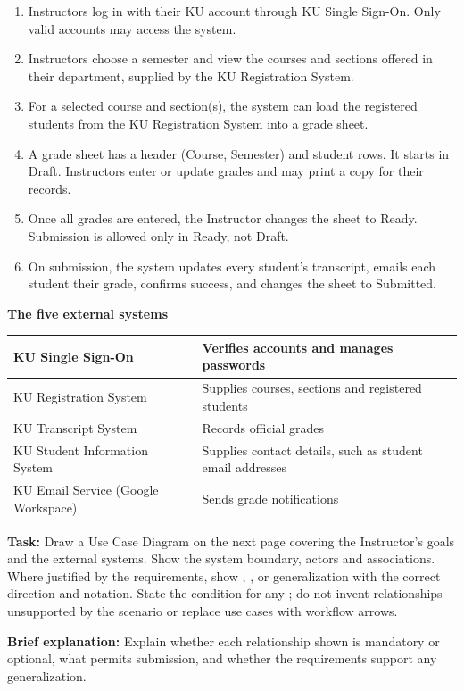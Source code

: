 \begin{enumerate}[itemsep=3pt]
\item Instructors log in with their KU account through KU Single Sign-On. Only valid accounts may access the system.
\item Instructors choose a semester and view the courses and sections offered in their department, supplied by the KU Registration System.
\item For a selected course and section(s), the system can load the registered students from the KU Registration System into a grade sheet.
\item A grade sheet has a header (Course, Semester) and student rows. It starts in Draft. Instructors enter or update grades and may print a copy for their records.
\item Once all grades are entered, the Instructor changes the sheet to Ready. Submission is allowed only in Ready, not Draft.
\item On submission, the system updates every student's transcript, emails each student their grade, confirms success, and changes the sheet to Submitted.
\end{enumerate}
\textbf{The five external systems}\par
\begin{tabularx}{\linewidth}{|>{\raggedright\arraybackslash}m{5.3cm}|Y|}\hline
KU Single Sign-On & Verifies accounts and manages passwords\\\hline
KU Registration System & Supplies courses, sections and registered students\\\hline
KU Transcript System & Records official grades\\\hline
KU Student Information System & Supplies contact details, such as student email addresses\\\hline
KU Email Service (Google Workspace) & Sends grade notifications\\\hline
\end{tabularx}
\par\medskip
\textbf{Task:} Draw a Use Case Diagram on the next page covering the Instructor's goals and the external systems. Show the system boundary, actors and associations. Where justified by the requirements, show , , or generalization with the correct direction and notation. State the condition for any ; do not invent relationships unsupported by the scenario or replace use cases with workflow arrows.\par
\textbf{Brief explanation:} Explain whether each relationship shown is mandatory or optional, what permits submission, and whether the requirements support any generalization.\par
